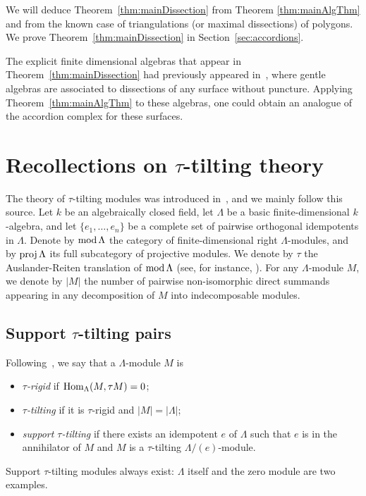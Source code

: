 \documentclass{amsart}
\theoremstyle{definition}
\newcommand{\darkblue}{\color{darkblue}} %
\newcommand{\defn}[1]{\textsl{\darkblue #1}} %
\newcommand{\MOD}{\mbox{{\rm mod \!}}}
\newcommand{\proj}{\operatorname{{\rm proj }}}
\newcommand{\Hom}[1]{\operatorname{{\rm Hom}}_{#1}}
\begin{document}
We will deduce Theorem~\ref{thm:mainDissection} from Theorem \ref{thm:mainAlgThm} and from the known case of triangulations (or maximal dissections) of polygons.  We prove Theorem~\ref{thm:mainDissection} in Section~\ref{sec:accordions}.

The explicit finite dimensional algebras that appear in Theorem~\ref{thm:mainDissection} had previously appeared in~\cite{DavidRoeslerSchiffler, DavidRoesler}, where gentle algebras are associated to dissections of any surface without puncture. Applying Theorem~\ref{thm:mainAlgThm} to these algebras, one could obtain an analogue of the accordion complex for these surfaces.



\section{Recollections on $\tau$-tilting theory}
\label{sec:recollections}

\enlargethispage{.1cm}
The theory of $\tau$-tilting modules was introduced in~\cite{AdachiIyamaReiten}, and we mainly follow this source.
Let $k$ be an algebraically closed field, let $\Lambda$ be a basic finite-dimensional $k$-algebra, 
and let $\{e_1, \dots, e_n\}$ be a complete set of pairwise orthogonal idempotents in $\Lambda$.
Denote by $\MOD \Lambda$ the category of finite-dimensional right $\Lambda$-modules, 
and by $\proj \Lambda$ its full subcategory of projective modules.
We denote by $\tau$ the Auslander-Reiten translation of $\MOD \Lambda$ (see, for instance, \cite[Chapter IV]{AssemSimsonSkowronski}).
For any $\Lambda$-module $M$, we denote by $|M|$ the number of pairwise non-isomorphic direct summands appearing 
in any decomposition of $M$ into indecomposable modules.


\subsection{Support $\tau$-tilting pairs}

Following~\cite[Def.~0.1]{AdachiIyamaReiten}, we say that a $\Lambda$-module $M$ is 
\begin{itemize}
 \item \defn{$\tau$-rigid} if $\Hom{\Lambda}(M, \tau M) = 0$;
 \item \defn{$\tau$-tilting} if it is $\tau$-rigid and $|M|=|\Lambda|$;
 \item \defn{support $\tau$-tilting} if there exists an idempotent $e$ of $\Lambda$ such that
       $e$ is in the annihilator of $M$ and $M$ is a $\tau$-tilting $\Lambda/(e)$-module.
\end{itemize}
Support $\tau$-tilting modules always exist: $\Lambda$ itself and the zero module are two examples.
\end{document}
